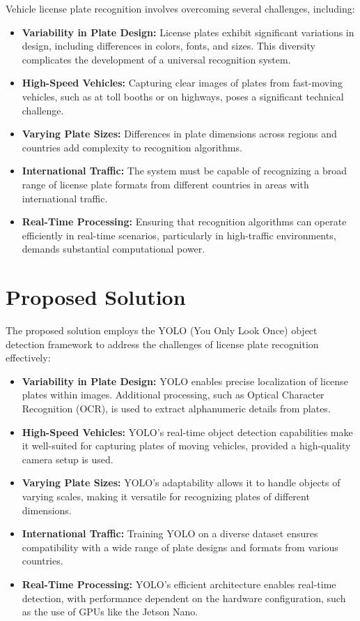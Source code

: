 Vehicle license plate recognition involves overcoming several challenges, including:\cite{Awalgaonkar:2021}

\begin{itemize}
	\item \textbf{Variability in Plate Design:} License plates exhibit significant variations in design, including differences in colors, fonts, and sizes. This diversity complicates the development of a universal recognition system.
	\item \textbf{High-Speed Vehicles:} Capturing clear images of plates from fast-moving vehicles, such as at toll booths or on highways, poses a significant technical challenge.
	\item \textbf{Varying Plate Sizes:} Differences in plate dimensions across regions and countries add complexity to recognition algorithms.
	\item \textbf{International Traffic:} The system must be capable of recognizing a broad range of license plate formats from different countries in areas with international traffic.
	\item \textbf{Real-Time Processing:} Ensuring that recognition algorithms can operate efficiently in real-time scenarios, particularly in high-traffic environments, demands substantial computational power.
\end{itemize}

\section{Proposed Solution}

The proposed solution employs the YOLO (You Only Look Once) object detection framework to address the challenges of license plate recognition effectively:\cite{Sung:2020}

\begin{itemize}
	\item \textbf{Variability in Plate Design:} YOLO enables precise localization of license plates within images. Additional processing, such as Optical Character Recognition (OCR), is used to extract alphanumeric details from plates.
	\item \textbf{High-Speed Vehicles:} YOLO's real-time object detection capabilities make it well-suited for capturing plates of moving vehicles, provided a high-quality camera setup is used.
	\item \textbf{Varying Plate Sizes:} YOLO's adaptability allows it to handle objects of varying scales, making it versatile for recognizing plates of different dimensions.
	\item \textbf{International Traffic:} Training YOLO on a diverse dataset ensures compatibility with a wide range of plate designs and formats from various countries.
	\item \textbf{Real-Time Processing:} YOLO's efficient architecture enables real-time detection, with performance dependent on the hardware configuration, such as the use of GPUs like the Jetson Nano.
\end{itemize}

